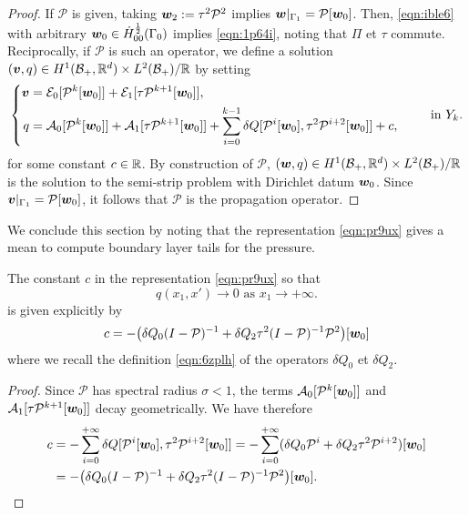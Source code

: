 \documentclass[a4paper,10pt,reqno]{amsart}
\begin{document}
   \begin{proof}
       If $\mathcal{P}$ is given, taking $\w_2:=\tau^{2}\mathcal{P}^{2}$ implies
       ${\bm w}|_{\Gamma_1}=\mathcal{P}[{\bm w}_0]$. Then, \cref{eqn:ible6} with arbitrary
       ${\bm w}_0\in\dot{H}^{\frac{1}{2}}_{00}(\Gamma_0)$ implies
       \cref{eqn:1p64i}, noting that $\Pi$ et $\tau$ commute. Reciprocally, if
       $\mathcal{P}$ is such an operator, we define a solution $({\bm v},q)\in
       H^{1}(\mathcal{B}_+,\mathbb{R}^{d})\times L^{2}(\mathcal{B}_+)/\mathbb{R}$ by setting    
       \begin{equation}
       \label{eqn:pr9ux}
           \left\{\begin{aligned}
           \v & =
           \mathcal{E}_0[\mathcal{P}^{k}[\w_0]]+\mathcal{E}_1[\tau\mathcal{P}^{k+1}[\w_0]],\\
q     & =\mathcal{A}_0[\mathcal{P}^{k}[\w_0]]+\mathcal{A}_1[\tau\mathcal{P}^{k+1}[\w_0]]+\sum_{i=0}^{k-1}
           \delta Q[\mathcal{P}^{i}[\w_0],\tau^{2}\mathcal{P}^{i+2}[\w_0]]+c,
           \end{aligned}
           \right.\qquad  \In Y_k.
       \end{equation}
       for some constant $c\in\mathbb{R}$. 
       By construction of $\mathcal{P}$, $({\bm w},q)\in H^{1}(\mathcal{B}_+,\mathbb{R}^{d})\times
       L^{2}(\mathcal{B}_+)/\mathbb{R}$ is the solution to the semi-strip
       problem with Dirichlet datum ${\bm w}_0$. Since ${\bm v}|_{\Gamma_1}=\mathcal{P}[{\bm w}_0]$,
       it follows that $\mathcal{P}$ is the propagation operator.
   \end{proof}
   We conclude this section by noting that the representation \cref{eqn:pr9ux} gives
   a mean to compute boundary layer tails for the pressure.     
   \begin{proposition}
       The constant $c$ in the representation \cref{eqn:pr9ux} so that 
   \[
   q(x_1,x')\rightarrow 0 \text{ as }x_1\rightarrow +\infty. 
   \] 
   is given explicitly by 
   \[
   c=-\big(\delta Q_0 (I-\mathcal{P})^{-1} +\delta Q_2\tau^{2}(I-\mathcal{P})^{-1}
      \mathcal{P}^{2}\big)[\w_0]
   \] 
   where we recall the definition \cref{eqn:6zplh} of the operators $\delta Q_0$ et
   $\delta Q_2$.
   \end{proposition}    
   \begin{proof}
  Since $\mathcal{P}$ has spectral radius $\sigma<1$, the terms
  $\mathcal{A}_0[\mathcal{P}^{k}[{\bm w}_0]]$ and $\mathcal{A}_1[\tau
  \mathcal{P}^{k+1}[\w_0]]$ decay geometrically. We have therefore  
  \[
      \begin{aligned}
      c & =-\sum_{i=0}^{+\infty}\delta
      Q[\mathcal{P}^{i}[\w_0],\tau^{2}\mathcal{P}^{i+2}[\w_0]]  
      = -\sum_{i=0}^{+\infty} (\delta Q_0 \mathcal{P}^{i} +\delta Q_2
      \tau^{2}\mathcal{P}^{i+2})[\w_0]\\    
      &=-\big(\delta Q_0 (I-\mathcal{P})^{-1} +\delta Q_2\tau^{2}(I-\mathcal{P})^{-1}
      \mathcal{P}^{2}\big)[\w_0].
      \end{aligned}
  \] 
   \end{proof}    
\end{document}
